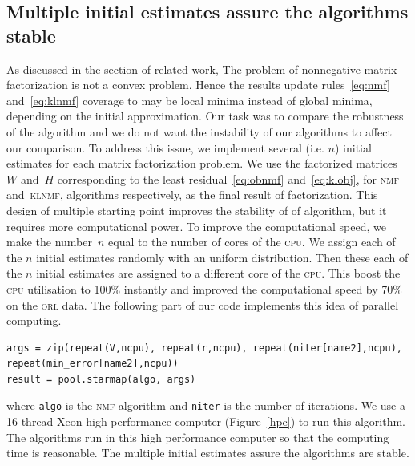 \subsection{Multiple initial estimates assure the algorithms stable}
As discussed in the section of related work,
The problem of nonnegative matrix factorization is not a convex problem.
Hence the results update rules~\eqref{eq:nmf} and~\eqref{eq:klnmf} coverage to may be local minima instead of global minima, depending on the initial approximation.
Our task was to compare the robustness of the algorithm and we do not want the instability of our algorithms to affect our comparison.
To address this issue, we implement several (i.e. $n$) initial estimates for each matrix factorization problem.
We use the factorized matrices~$W$ and~$H$ corresponding to the least residual~\eqref{eq:obnmf} and~\eqref{eq:klobj}, for \textsc{nmf} and~\textsc{klnmf}, algorithms respectively, as the final result of factorization.
This design of multiple starting point improves the stability of of algorithm, but it requires more computational power. To improve the computational speed, we make the number~$n$ equal to the number of cores of the \textsc{cpu}. We assign each of the $n$ initial estimates randomly with an uniform distribution. Then these each of the $n$ initial estimates are assigned to a different core of the \textsc{cpu}. This boost the \textsc{cpu} utilisation to 100\% instantly and improved the computational speed by 70\% on the \textsc{orl} data. The following part of our code implements this idea of parallel computing.
\begin{lstlisting}[caption=Centring image data, label=matn1]
args = zip(repeat(V,ncpu), repeat(r,ncpu), repeat(niter[name2],ncpu), repeat(min_error[name2],ncpu))
result = pool.starmap(algo, args)
\end{lstlisting}
where \texttt{algo} is the \textsc{nmf} algorithm and \texttt{niter} is the number of iterations. We use a 16-thread Xeon high performance computer (Figure~\ref{hpc}) to run this algorithm.
 The algorithms run in this high performance computer so that the computing time is reasonable.  The multiple initial estimates assure the algorithms are stable.




